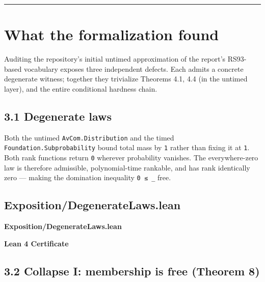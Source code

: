 \documentclass[11pt,a4paper]{article}
\begin{document}
\begin{center}\rule{0.5\linewidth}{0.5pt}\end{center}

\hypertarget{what-the-formalization-found}{%
\section{What the formalization found}\label{what-the-formalization-found}}

Auditing the repository's initial untimed approximation of the report's RS93-based vocabulary exposes three independent defects. Each admits a concrete degenerate witness; together they trivialize Theorems 4.1, 4.4 (in the untimed layer), and the entire conditional hardness chain.

\hypertarget{degenerate-laws}{%
\subsection{3.1 Degenerate laws}\label{degenerate-laws}}

Both the untimed \texttt{AvCom.Distribution} and the timed \texttt{Foundation.Subprobability} bound total mass by \texttt{1} rather than fixing it at \texttt{1}. Both rank functions return \texttt{0} wherever probability vanishes. The everywhere-zero law is therefore admissible, polynomial-time rankable, and has rank identically zero --- making the domination inequality \texttt{0\ ≤\ \_} free.

\hypertarget{exposition-degeneratelaws-lean}{%
\subsection{Exposition/DegenerateLaws.lean}\label{exposition-degeneratelaws-lean}}

\noindent\textbf{Exposition/DegenerateLaws.lean}

\vspace{0.75\baselineskip}
\noindent\textcolor{green!40!black}{\textbf{Lean 4 Certificate}}\par\vspace{0.25\baselineskip}

\vspace{0.75\baselineskip}

\hypertarget{collapse-i-membership-is-free-theorem-8}{%
\subsection{3.2 Collapse I: membership is free (Theorem 8)}\label{collapse-i-membership-is-free-theorem-8}}
\end{document}
